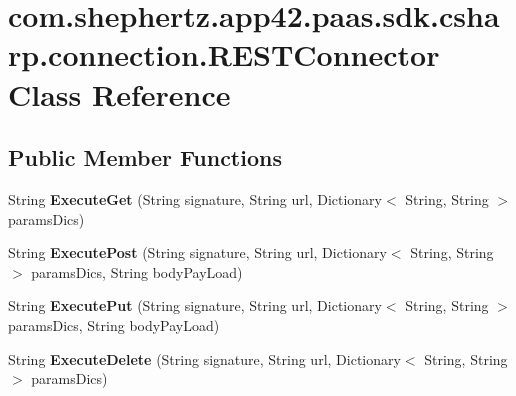 \hypertarget{classcom_1_1shephertz_1_1app42_1_1paas_1_1sdk_1_1csharp_1_1connection_1_1_r_e_s_t_connector}{\section{com.\+shephertz.\+app42.\+paas.\+sdk.\+csharp.\+connection.\+R\+E\+S\+T\+Connector Class Reference}
\label{classcom_1_1shephertz_1_1app42_1_1paas_1_1sdk_1_1csharp_1_1connection_1_1_r_e_s_t_connector}
}
\subsection*{Public Member Functions}
\begin{DoxyCompactItemize}
\item 
\hypertarget{classcom_1_1shephertz_1_1app42_1_1paas_1_1sdk_1_1csharp_1_1connection_1_1_r_e_s_t_connector_aba6531c4418223bd0f108f31aad7e391}{String {\bfseries Execute\+Get} (String signature, String url, Dictionary$<$ String, String $>$ params\+Dics)}\label{classcom_1_1shephertz_1_1app42_1_1paas_1_1sdk_1_1csharp_1_1connection_1_1_r_e_s_t_connector_aba6531c4418223bd0f108f31aad7e391}

\item 
\hypertarget{classcom_1_1shephertz_1_1app42_1_1paas_1_1sdk_1_1csharp_1_1connection_1_1_r_e_s_t_connector_a4ef33661e6cc8d60bfaeda2f092070a4}{String {\bfseries Execute\+Post} (String signature, String url, Dictionary$<$ String, String $>$ params\+Dics, String body\+Pay\+Load)}\label{classcom_1_1shephertz_1_1app42_1_1paas_1_1sdk_1_1csharp_1_1connection_1_1_r_e_s_t_connector_a4ef33661e6cc8d60bfaeda2f092070a4}

\item 
\hypertarget{classcom_1_1shephertz_1_1app42_1_1paas_1_1sdk_1_1csharp_1_1connection_1_1_r_e_s_t_connector_a91b3c643beecdbb02497521cc6b0e054}{String {\bfseries Execute\+Put} (String signature, String url, Dictionary$<$ String, String $>$ params\+Dics, String body\+Pay\+Load)}\label{classcom_1_1shephertz_1_1app42_1_1paas_1_1sdk_1_1csharp_1_1connection_1_1_r_e_s_t_connector_a91b3c643beecdbb02497521cc6b0e054}

\item 
\hypertarget{classcom_1_1shephertz_1_1app42_1_1paas_1_1sdk_1_1csharp_1_1connection_1_1_r_e_s_t_connector_ac3829c6da81b138860a93e872de9bfce}{String {\bfseries Execute\+Delete} (String signature, String url, Dictionary$<$ String, String $>$ params\+Dics)}\label{classcom_1_1shephertz_1_1app42_1_1paas_1_1sdk_1_1csharp_1_1connection_1_1_r_e_s_t_connector_ac3829c6da81b138860a93e872de9bfce}


\end{DoxyCompactItemize}

